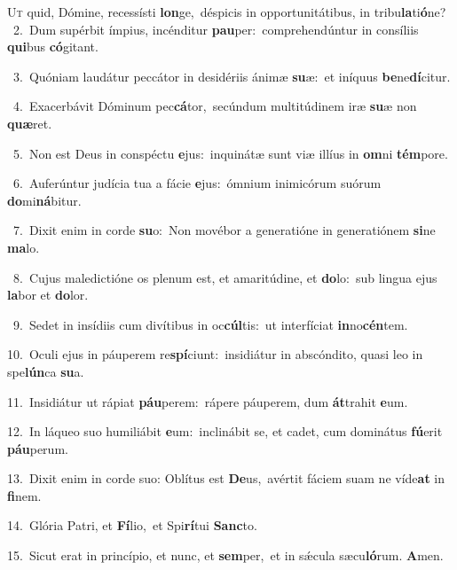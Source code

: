 \lettrine{\initial\textcolor{\initialcolor}{U}}{t} quid, Dómine, recessísti \textbf{lon}\-ge,~\star déspicis in opportunitátibus, in tribu\-\textbf{la}\-ti\-\textbf{ó}\-ne?\\
{\numbfont\textcolor{\numbcolor}{~2.}}~Dum supérbit ímpius, incénditur \textbf{pau}\-per:~\star comprehendúntur in consíliis \textbf{qui}\-bus \textbf{có}\-gitant.\par
{\numbfont\textcolor{\numbcolor}{~3.}}~Quóniam laudátur peccátor in desidériis ánimæ \textbf{su}\-æ:~\star et iníquus \textbf{be}\-ne\-\textbf{dí}\-citur.\par
{\numbfont\textcolor{\numbcolor}{~4.}}~Exacerbávit Dóminum pec\-\textbf{cá}\-tor,~\star secúndum multitúdinem iræ \textbf{su}\-æ non \textbf{quæ}\-ret.\par
{\numbfont\textcolor{\numbcolor}{~5.}}~Non est Deus in conspéctu \textbf{e}\-jus:~\star inquinátæ sunt viæ illíus in \textbf{om}\-ni \textbf{tém}\-pore.\par
{\numbfont\textcolor{\numbcolor}{~6.}}~Auferúntur judícia tua a fácie \textbf{e}\-jus:~\star ómnium inimicórum suórum \textbf{do}\-mi\-\textbf{ná}\-bitur.\par
{\numbfont\textcolor{\numbcolor}{~7.}}~Dixit enim in corde \textbf{su}\-o:~\star Non movébor a generatióne in generatiónem \textbf{si}\-ne \textbf{ma}\-lo.\par
{\numbfont\textcolor{\numbcolor}{~8.}}~Cujus maledictióne os plenum est, et amaritúdine, et \textbf{do}\-lo:~\star sub lingua ejus \textbf{la}\-bor et \textbf{do}\-lor.\par
{\numbfont\textcolor{\numbcolor}{~9.}}~Sedet in insídiis cum divítibus in oc\-\textbf{cúl}\-tis:~\star ut interfíciat \textbf{in}\-no\-\textbf{cén}\-tem.\par
{\numbfont\textcolor{\numbcolor}{10.}}~Oculi ejus in páuperem re\-\textbf{spí}\-ciunt:~\star insidiátur in abscóndito, quasi leo in spe\-\textbf{lún}\-ca \textbf{su}\-a.\par
{\numbfont\textcolor{\numbcolor}{11.}}~Insidiátur ut rápiat \textbf{páu}\-perem:~\star rápere páuperem, dum \textbf{át}\-trahit \textbf{e}\-um.\par
{\numbfont\textcolor{\numbcolor}{12.}}~In láqueo suo humiliábit \textbf{e}\-um:~\star inclinábit se, et cadet, cum dominátus \textbf{fú}\-erit \textbf{páu}\-perum.\par
{\numbfont\textcolor{\numbcolor}{13.}}~Dixit enim in corde suo: Oblítus est \textbf{De}\-us,~\star avértit fáciem suam ne víde\textbf{at} in \textbf{fi}\-nem.\par
{\numbfont\textcolor{\numbcolor}{14.}}~Glória Patri, et \textbf{Fí}\-lio,~\star et Spi\-\textbf{rí}\-tui \textbf{Sanc}\-to.\par
{\numbfont\textcolor{\numbcolor}{15.}}~Sicut erat in princípio, et nunc, et \textbf{sem}\-per,~\star et in sǽcula sæcu\-\textbf{ló}\-rum. \textbf{A}\-men.\par

